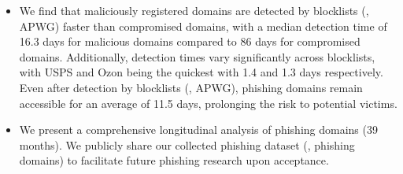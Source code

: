 \begin{itemize}[leftmargin=*, topsep=0pt, itemsep=0em]
\item We find that maliciously registered domains are detected by blocklists (\eg, APWG) faster than compromised domains, with a median detection time of 16.3 days for malicious domains compared to 86 days for compromised domains. 
Additionally, detection times vary significantly across blocklists, with USPS and Ozon being the quickest with 1.4 and 1.3 days respectively. 
Even after detection by blocklists (\eg, APWG), phishing domains remain accessible for an average of 11.5 days, prolonging the risk to potential victims.
\item We present a comprehensive longitudinal analysis of phishing domains (39 months). We publicly share our collected phishing dataset (\ie, phishing domains) to facilitate future phishing research upon acceptance.
\end{itemize}










